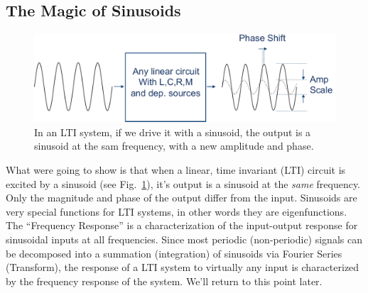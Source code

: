 \subsection{The Magic of Sinusoids}
\begin{figure}[tb]
\begin{center}
\includegraphics[width=.75\columnwidth]{lti_sine}
\end{center}
\caption{In an LTI system, if we drive it with a sinusoid, the output is a sinusoid at the sam frequency, with a new amplitude and phase. }
\label{fig:lti_sine}
\end{figure}
What were going to show is that when a linear, time invariant (LTI) circuit is excited by a sinusoid (see Fig.~\ref{fig:lti_sine}), it's output is a sinusoid at the \emph{same} frequency.  Only the magnitude and phase of the output differ from the input.  Sinusoids are very special functions for LTI systems, in other words they are eigenfunctions.  The ``Frequency Response'' is a characterization of the input-output response for sinusoidal inputs at all frequencies.
Since most periodic (non-periodic) signals can be decomposed into a summation (integration) of sinusoids via Fourier Series (Transform), the response of a LTI system to virtually any input is characterized by the frequency response of the system.  We'll return to this point later.

